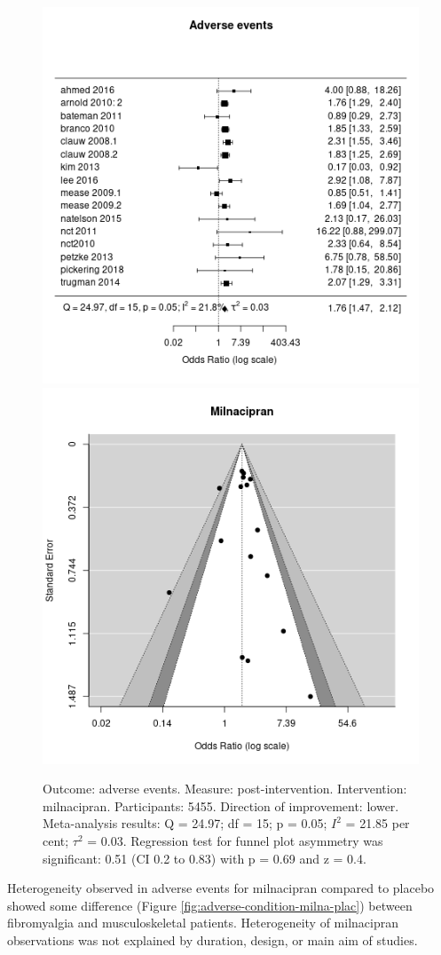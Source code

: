 \documentclass{report}\usepackage[]{graphicx}\usepackage[]{color}
\newenvironment{knitrout}{}{} %
\begin{document}
\begin{figure}

\begin{knitrout}
\color{fgcolor}
\includegraphics[width=0.5\linewidth,height=0.35\textheight]{img/adverse-milnacipran- - -forest} 
\includegraphics[width=0.5\linewidth,height=0.35\textheight]{img/adverse-milnacipran- - -funnel} 
\end{knitrout}

\caption[Adverse events: milnacipran]{Outcome: adverse events. Measure: post-intervention. Intervention: milnacipran. Participants: 5455. Direction of improvement: lower. Meta-analysis results: Q = 24.97; df = 15; p = 0.05; $I^2$ = 21.85 per cent; $\tau^2$ = 0.03. Regression test for funnel plot asymmetry was significant: 0.51 (CI 0.2 to 0.83) with p = 0.69 and z = 0.4.}
\label{fig:adverse-milna}
\end{figure}


Heterogeneity observed in adverse events for milnacipran compared to placebo showed some difference (Figure \ref{fig:adverse-condition-milna-plac}) between fibromyalgia and musculoskeletal patients. Heterogeneity of milnacipran observations was not explained by duration, design, or main aim of studies.
\end{document}
